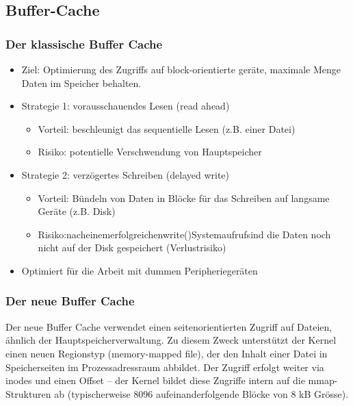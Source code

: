 \documentclass[a4paper, 10pt]{article}
\begin{document}
\subsection{Buffer-Cache}
\subsubsection{Der klassische Buffer Cache}
\begin{itemize}
	\item Ziel: Optimierung des Zugriffs auf block-orientierte geräte, maximale Menge Daten im Speicher behalten.
	\item Strategie 1: vorausschauendes Lesen (read ahead)
		\begin{itemize}
			\item Vorteil: beschleunigt das sequentielle Lesen (z.B. einer Datei)
			\item Risiko: potentielle Verschwendung von Hauptspeicher
		\end{itemize}
	\item Strategie 2: verzögertes Schreiben (delayed write)
		\begin{itemize}
			\item Vorteil: Bündeln von Daten in Blöcke für das Schreiben auf langsame Geräte (z.B. Disk)
			\item Risiko:nacheinemerfolgreichenwrite()Systemaufrufsind die Daten noch nicht auf der Disk gespeichert (Verlustrisiko)
		\end{itemize}
	\item Optimiert für die Arbeit mit dummen Peripheriegeräten
\end{itemize}
\subsubsection{Der neue Buffer Cache}
Der neue Buffer Cache verwendet einen seitenorientierten Zugriff auf Dateien, ähnlich der Hauptspeicherverwaltung. Zu diesem Zweck unterstützt der Kernel einen neuen Regionstyp (memory-mapped file), der den Inhalt einer Datei in Speicherseiten im Prozessadressraum abbildet. Der Zugriff erfolgt weiter via inodes und einen Offset – der Kernel bildet diese Zugriffe intern auf die mmap- Strukturen ab (typischerweise 8096 aufeinanderfolgende
Blöcke von 8 kB Grösse).
\end{document}
